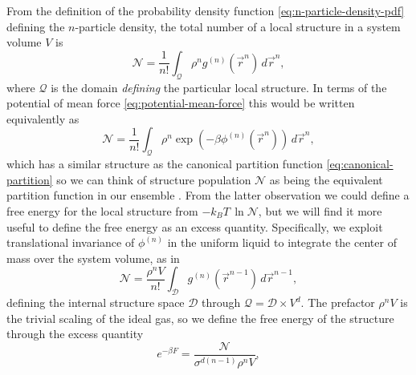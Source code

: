 \documentclass[11pt,twoside]{report}
\begin{document}
From the definition of the probability density function  \eqref{eq:n-particle-density-pdf} defining the $n$-particle density, the total number of a local structure in a system volume $V$ is
\begin{equation}\label{eq:structure-population}
  \mathcal{N}
  =
  \frac{1}{n!}
  \int_{\mathcal{Q}}
  \rho^n g^{(n)}(\vec{r}^n)
  \, d\vec{r}^n,
\end{equation}
where $\mathcal{Q}$ is the domain \emph{defining} the particular local structure.
In terms of the potential of mean force \eqref{eq:potential-mean-force} this would be written equivalently as
\begin{equation*}
  \mathcal{N}
  =
  \frac{1}{n!}
  \int_{\mathcal{Q}}
  \rho^n \exp{\left(-\beta\phi^{(n)}(\vec{r}^n)\right)}
  \, d\vec{r}^n,
\end{equation*}
which has a similar structure as the canonical partition function \eqref{eq:canonical-partition} so we can think of structure population $\mathcal{N}$ as being the equivalent partition function in our ensemble%
.
From the latter observation we could define a free energy for the local structure from $-k_B T \, \ln{\mathcal{N}}$,
but we will find it more useful to define the free energy as an excess quantity.
Specifically, we exploit translational invariance of $\phi^{(n)}$ in the uniform liquid to integrate the center of mass over the system volume, as in
\begin{equation}
  \mathcal{N}
  =
  \frac{\rho^n V}{n!}
  \int_\mathcal{D}
  g^{(n)}(\vec{r}^{n-1})
  \, d\vec{r}^{n-1},
\end{equation}
defining the internal structure space $\mathcal{D}$ through $\mathcal{Q} = \mathcal{D} \times V^d$.
The prefactor $\rho^n V$ is the trivial scaling of the ideal gas, so we define the free energy of the structure through the excess quantity%
\begin{equation*}
  e^{-\beta F}
  =
  \frac{\mathcal{N}}{\sigma^{d(n-1)} \rho^n V},
\end{equation*}
\end{document}
